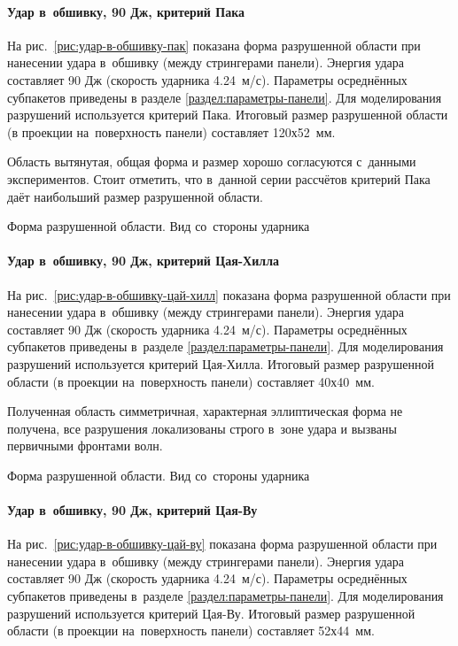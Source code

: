 \documentclass[thesis.tex]{subfiles}
\begin{document}
\newpage
\paragraph{Удар в~обшивку, 90 Дж, критерий Пака}

На рис.~\ref{рис:удар-в-обшивку-пак} показана форма разрушенной области при нанесении удара в~обшивку (между стрингерами
панели). Энергия удара составляет 90 Дж (скорость ударника 4.24~м/с). Параметры осреднённых субпакетов приведены в
разделе \ref{раздел:параметры-панели}. Для моделирования разрушений используется критерий Пака. Итоговый размер
разрушенной области (в проекции на~поверхность панели) составляет 120х52~мм.

Область вытянутая, общая форма и размер хорошо согласуются с~данными экспериментов. Стоит отметить, что в~данной серии
рассчётов критерий Пака даёт наибольший размер разрушенной области.

    {Форма разрушенной области. Вид со~стороны ударника}

\newpage
\paragraph{Удар в~обшивку, 90 Дж, критерий Цая-Хилла}

На рис.~\ref{рис:удар-в-обшивку-цай-хилл} показана форма разрушенной области при нанесении удара в~обшивку (между
стрингерами панели). Энергия удара составляет 90 Дж (скорость ударника 4.24~м/с). Параметры осреднённых субпакетов
приведены в~разделе \ref{раздел:параметры-панели}. Для моделирования разрушений используется критерий Цая-Хилла.
Итоговый размер разрушенной области (в проекции на~поверхность панели) составляет 40х40~мм.

Полученная область симметричная, характерная эллиптическая форма не получена, все разрушения локализованы строго в~зоне
удара и вызваны первичными фронтами волн.

    {Форма разрушенной области. Вид со~стороны ударника}

\newpage
\paragraph{Удар в~обшивку, 90 Дж, критерий Цая-Ву}

На рис.~\ref{рис:удар-в-обшивку-цай-ву} показана форма разрушенной области при нанесении удара в~обшивку (между
стрингерами панели). Энергия удара составляет 90 Дж (скорость ударника 4.24~м/с). Параметры осреднённых субпакетов
приведены в~разделе \ref{раздел:параметры-панели}. Для моделирования разрушений используется критерий Цая-Ву. Итоговый
размер разрушенной области (в проекции на~поверхность панели) составляет 52х44~мм.
\end{document}
